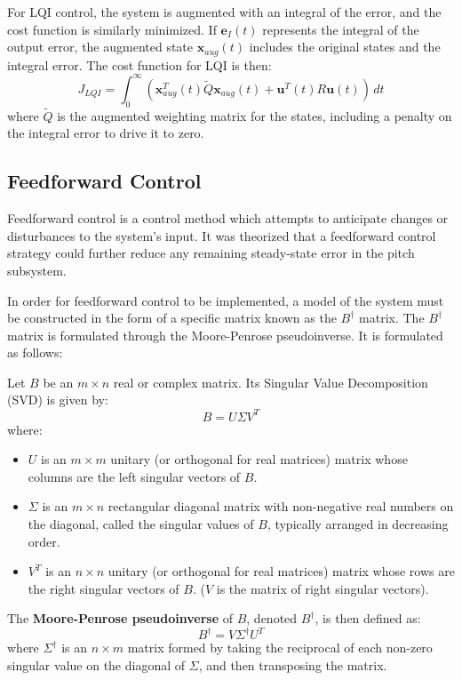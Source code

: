 For LQI control, the system is augmented with an integral of the error, and the cost function is similarly minimized. If $\mathbf{e}_I(t)$ represents the integral of the output error, the augmented state $\mathbf{x}_{aug}(t)$ includes the original states and the integral error. The cost function for LQI is then:
$$ J_{LQI} = \int_{0}^{\infty} (\mathbf{x}_{aug}^T(t) \tilde{Q} \mathbf{x}_{aug}(t) + \mathbf{u}^T(t) R \mathbf{u}(t)) \, dt $$
where $\tilde{Q}$ is the augmented weighting matrix for the states, including a penalty on the integral error to drive it to zero.


\subsection{Feedforward Control}

Feedforward control is a control method which attempts to anticipate changes or disturbances to the system's input. It was theorized that a feedforward control strategy could further reduce any remaining steady-state error in the pitch subsystem.

In order for feedforward control to be implemented, a model of the system must be constructed in the form of a specific matrix known as the $B^\dagger$ matrix. The $B^\dagger$ matrix is formulated through the Moore-Penrose pseudoinverse. It is formulated as follows:

Let $B$ be an $m \times n$ real or complex matrix. Its Singular Value Decomposition (SVD) is given by:
$$B = U \Sigma V^T$$
where:
\begin{itemize}
    \item $U$ is an $m \times m$ unitary (or orthogonal for real matrices) matrix whose columns are the left singular vectors of $B$.
    \item $\Sigma$ is an $m \times n$ rectangular diagonal matrix with non-negative real numbers on the diagonal, called the singular values of $B$, typically arranged in decreasing order.
    \item $V^T$ is an $n \times n$ unitary (or orthogonal for real matrices) matrix whose rows are the right singular vectors of $B$. ($V$ is the matrix of right singular vectors).
\end{itemize}

The \textbf{Moore-Penrose pseudoinverse} of $B$, denoted $B^\dagger$, is then defined as:
$$B^\dagger = V \Sigma^\dagger U^T$$
where $\Sigma^\dagger$ is an $n \times m$ matrix formed by taking the reciprocal of each non-zero singular value on the diagonal of $\Sigma$, and then transposing the matrix.

